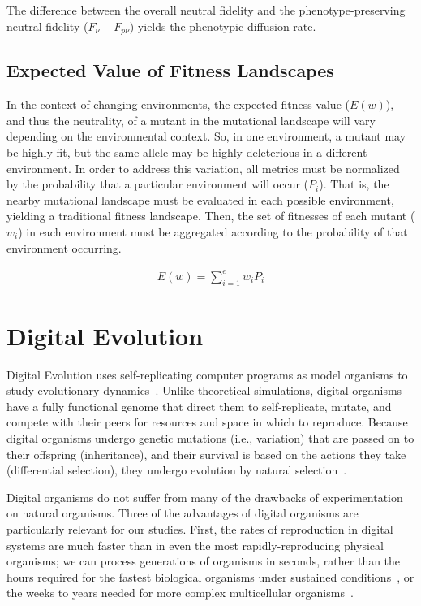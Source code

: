 \documentclass[PhD]{msu-thesis}
\begin{document}
The difference between the overall neutral fidelity and the phenotype-preserving neutral fidelity ($F_\nu - F_{p\nu}$) yields the phenotypic diffusion rate.

\subsection{Expected Value of Fitness Landscapes}
In the context of changing environments, the expected fitness value ($E(w)$), and thus the neutrality, of a mutant in the mutational landscape will vary depending on the environmental context. So, in one environment, a mutant may be highly fit, but the same allele may be highly deleterious in a different environment. In order to address this variation, all metrics must be normalized by the probability that a particular environment will occur ($P_i$). That is, the nearby mutational landscape must be evaluated in each possible environment, yielding a traditional fitness landscape. Then, the set of fitnesses of each mutant ($w_i$) in each environment must be aggregated according to the probability of that environment occurring.

	\begin{eqnarray}
	\label{eq:expected_fitness_value}
		E(w) = \displaystyle\sum_{i=1}^{e} w_i P_i
	\end{eqnarray}




\section{Digital Evolution}
Digital Evolution uses self-replicating computer programs as model organisms to study evolutionary dynamics~\cite{mckinley_harnessing_2008}. Unlike theoretical simulations, digital organisms have a fully functional genome that direct them to self-replicate, mutate, and compete with their peers for resources and space in which to reproduce. Because digital organisms undergo genetic mutations (i.e., variation) that are passed on to their offspring (inheritance), and their survival is based on the actions they take (differential selection), they undergo evolution by natural selection~\cite{dennett_darwins_1995}.

Digital organisms do not suffer from many of the drawbacks of experimentation on natural organisms. Three of the advantages of digital organisms are particularly relevant for our studies. First, the rates of reproduction in digital systems are much faster than in even the most rapidly-reproducing physical organisms; we can process generations of organisms in seconds, rather than the hours required for the fastest biological organisms under sustained conditions~\cite{ryan_evolution_1953,lenski_long-term_1991}, or the weeks to years needed for more complex multicellular organisms~\cite{anderson_outcrossing_2010,stearns_experimental_2000}.
\end{document}
